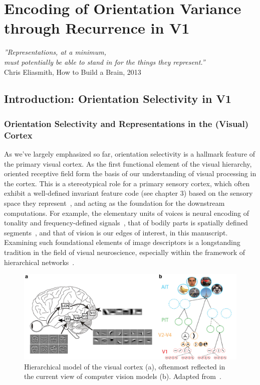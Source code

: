 \chapter{Encoding of Orientation Variance through Recurrence in V1}

\begin{flushright}
    \textit{''Representations, at a minimum,\\
    must potentially be able to stand in for the things they represent.''}\\
    Chris Eliasmith, How to Build a Brain, 2013
\end{flushright}

\chaptertoc{}



\section{Introduction: Orientation Selectivity in V1}
\subsection{Orientation Selectivity and Representations in the (Visual) Cortex}
As we've largely emphasized so far, orientation selectivity is a hallmark feature of the primary visual cortex. As the first functional element of the visual hierarchy, oriented receptive field form the basis of our understanding of visual processing in the cortex. This is a stereotypical role for a primary sensory cortex, which often exhibit a well-defined invariant feature code (see chapter 3) based on the sensory space they represent~\cite{carandini2012normalization, keller2018predictive}, and acting as the foundation for the downstream computations. For example, the elementary units of voices is neural encoding of tonality and frequency-defined signals~\cite{belin2011understanding}, that of bodily parts is spatially defined segments~\cite{camon2019timing}, and that of vision is our edges of interest, in this manuscript. Examining such foundational elements of image descriptors is a longstanding tradition in the field of visual neuroscience, especially within the framework of hierarchical networks~\cite{van1992information}.

\begin{figure}[h!t]
\vspace{0.1cm}
\centering
\includegraphics[width=1.\textwidth]{fig/chap4_hierarchical.pdf}
\caption[Hierarchical model of the visual cortex.]{Hierarchical model of the visual cortex (a), oftenmost reflected in the current view of computer vision models (b). Adapted from~\cite{serre2010neuromorphic}.}
\label{fig_chap4_hierarchical}
\end{figure}

